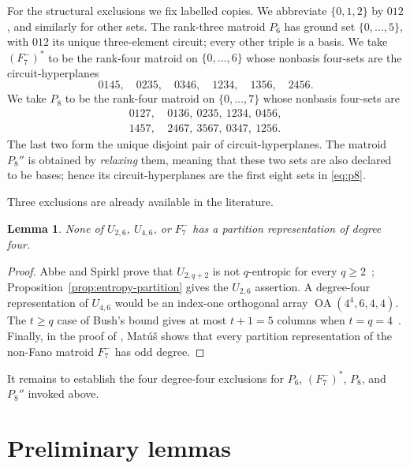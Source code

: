 \documentclass[preprint,12pt]{elsarticle}
\newtheorem{lemma}[theorem]{Lemma}
\theoremstyle{definition}
\newcommand{\OA}{\operatorname{OA}}
\begin{document}
For the structural exclusions we fix labelled copies. We abbreviate $\{0,1,2\}$ by $012$, and similarly for other sets. The rank-three matroid $P_6$ has ground set $\{0,\ldots,5\}$, with $012$ its unique three-element circuit; every other triple is a basis. We take $(F_7^-)^*$ to be the rank-four matroid on $\{0,\ldots,6\}$ whose nonbasis four-sets are the circuit-hyperplanes
\begin{equation}\label{eq:dnf}
0145,\quad0235,\quad0346,\quad1234,\quad1356,\quad2456.
\end{equation}
We take $P_8$ to be the rank-four matroid on $\{0,\ldots,7\}$ whose nonbasis four-sets are
\begin{equation}\label{eq:p8}
\begin{split}
0127,&\ 0136,\ 0235,\ 1234,\ 0456,\\
1457,&\ 2467,\ 3567,\ 0347,\ 1256.
\end{split}
\end{equation}
The last two form the unique disjoint pair of circuit-hyperplanes. The matroid $P_8''$ is obtained by \emph{relaxing} them, meaning that these two sets are also declared to be bases; hence its circuit-hyperplanes are the first eight sets in \eqref{eq:p8}.

Three exclusions are already available in the literature.

\begin{lemma}\label{lem:classical}
None of $U_{2,6}$, $U_{4,6}$, or $F_7^-$ has a partition representation of degree four.
\end{lemma}

\begin{proof}
Abbe and Spirkl prove that $U_{2,q+2}$ is not $q$-entropic for every $q\ge2$~\cite[Lemma~11]{AbbeSpirkl2019}; Proposition~\ref{prop:entropy-partition} gives the $U_{2,6}$ assertion. A degree-four representation of $U_{4,6}$ would be an index-one orthogonal array $\OA(4^4,6,4,4)$. The $t\ge q$ case of Bush's bound gives at most $t+1=5$ columns when $t=q=4$~\cite{Bush1952}. Finally, in the proof of \cite[Proposition~4.1]{Matus1999}, Mat\'u\v{s} shows that every partition representation of the non-Fano matroid $F_7^-$ has odd degree.
\end{proof}

It remains to establish the four degree-four exclusions for $P_6$,
$(F_7^-)^*$, $P_8$, and $P_8''$ invoked above.

\section{\texorpdfstring{Preliminary lemmas}{Preliminary lemmas}}\label{sec:tools}
\end{document}

